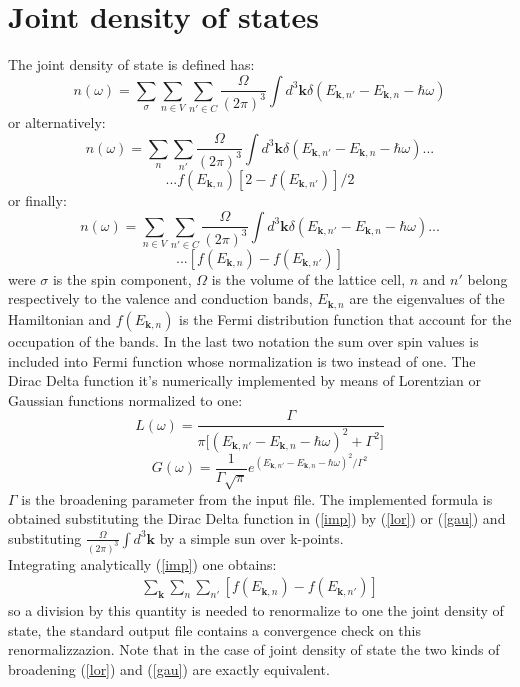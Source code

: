 \documentclass[twocolumn]{article}
\begin{document}
\section{Joint density of states}
The joint density of state is defined has:
\begin{displaymath}
n(\omega)=\sum_{\sigma}\sum_{n\in V}\sum_{n'\in C}\frac{\Omega}{(2\pi)^3}\int d^3\textbf{k}\delta(E_{\textbf{k},n'}-E_{\textbf{k},n}
-\hbar\omega)
\end{displaymath}
or alternatively:
\begin{equation}
n(\omega)=\sum_{n}\sum_{n'}\frac{\Omega}{(2\pi)^3}\int d^3\textbf{k}\delta(E_{\textbf{k},n'}-E_{\textbf{k},n}
-\hbar\omega)...
\label{imp2}
\end{equation}
\begin{displaymath}
...f(E_{\textbf{k},n})[2-f(E_{\textbf{k},n'})]/2
\end{displaymath}
or finally:
\begin{equation}
n(\omega)=\sum_{n\in V}\sum_{n'\in C}\frac{\Omega}{(2\pi)^3}\int d^3\textbf{k}\delta(E_{\textbf{k},n'}-E_{\textbf{k},n}
-\hbar\omega)...
\label{imp}
\end{equation}
\begin{displaymath}
...[f(E_{\textbf{k},n})-f(E_{\textbf{k},n'})]
\end{displaymath}
were $\sigma$ is the spin component, $\Omega$ is the volume of the lattice cell, $n$ and $n'$ belong respectively to the
valence and conduction bands,
$E_{\textbf{k},n}$ are the eigenvalues of the Hamiltonian and $f(E_{\textbf{k},n})$ is the Fermi distribution function
that account for the occupation of the bands. In the last two notation the sum over spin values is included into
Fermi function whose normalization is two instead of one.
The Dirac Delta function it's numerically implemented by means of Lorentzian
or Gaussian functions normalized to one:
\begin{equation}
L(\omega)=\frac{\Gamma}{\pi\big[(E_{\textbf{k},n'}-E_{\textbf{k},n}-\hbar\omega)^2+\Gamma^2\big]}
\label{lor}
\end{equation}
\begin{equation}
G(\omega)=\frac{1}{\Gamma\sqrt{\pi}}e^{(E_{\textbf{k},n'}-E_{\textbf{k},n}-\hbar\omega)^2/\Gamma^2}
\label{gau}
\end{equation}
$\Gamma$ is the broadening parameter from the input file. The implemented formula is obtained substituting the
Dirac Delta function in (\ref{imp}) by (\ref{lor}) or (\ref{gau}) and substituting $\frac{\Omega}{(2\pi)^3}\int
d^3\textbf{k}$ by a simple sun over k-points.\\
Integrating analytically (\ref{imp}) one obtains:
\begin{eqnarray}
\sum_{\textbf{k}}\sum_{n}\sum_{n'}[f(E_{\textbf{k},n})-f(E_{\textbf{k},n'})]
\end{eqnarray}
so a division by this quantity is needed to renormalize to one the joint density of state, the standard output file
contains a convergence check on this renormalizzazion. Note that in the case of
joint density of state the two kinds of broadening (\ref{lor}) and (\ref{gau}) are exactly equivalent.
\end{document}
